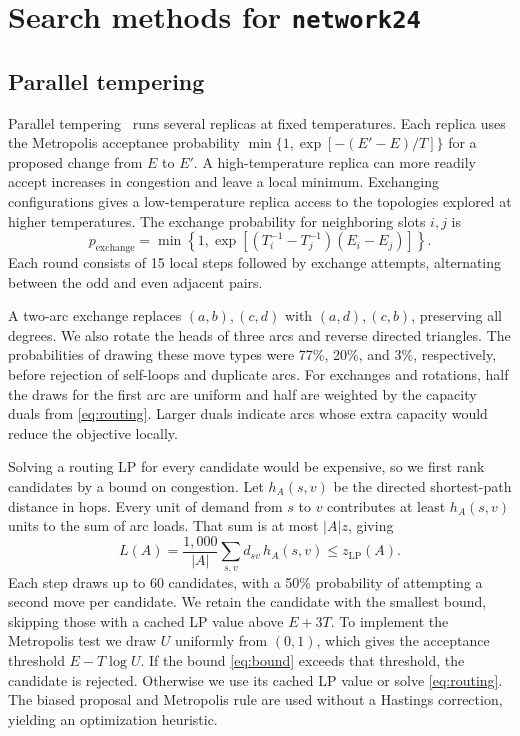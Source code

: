\documentclass[a4paper]{article}
\begin{document}
\section{Search methods for \texttt{network24}}

\subsection{Parallel tempering}

Parallel tempering~\cite{hukushima1996} runs several replicas at fixed temperatures.
Each replica uses the Metropolis acceptance probability \(\min\{1,\exp[-(E'-E)/T]\}\) for a proposed change from \(E\) to \(E'\).
A high-temperature replica can more readily accept increases in congestion and leave a local minimum.
Exchanging configurations gives a low-temperature replica access to the topologies explored at higher temperatures.
The exchange probability for neighboring slots \(i,j\) is
\[
 p_{\mathrm{exchange}}=\min\!\left\{1,\exp\!\left[
 (T_i^{-1}-T_j^{-1})(E_i-E_j)\right]\right\}.
\]
Each round consists of 15 local steps followed by exchange attempts, alternating between the odd and even adjacent pairs.

A two-arc exchange replaces \((a,b),(c,d)\) with \((a,d),(c,b)\), preserving all degrees. We also rotate the heads
of three arcs and reverse directed triangles. The probabilities of drawing these move types were
77\%, 20\%, and 3\%, respectively, before rejection of self-loops and duplicate arcs. For exchanges and rotations,
half the draws for the first arc are uniform and half are weighted by the capacity duals from \eqref{eq:routing}.
Larger duals indicate arcs whose extra capacity would reduce the objective locally.

Solving a routing LP for every candidate would be expensive, so we first rank candidates by a bound on congestion.
Let \(h_A(s,v)\) be the directed shortest-path distance in hops. Every unit of demand from \(s\) to \(v\) contributes
at least \(h_A(s,v)\) units to the sum of arc loads. That sum is at most \(\lvert A\rvert z\), giving
\begin{equation}
\label{eq:bound}
 L(A)=\frac{1{,}000}{\lvert A\rvert}\sum_{s,v}d_{sv}\,h_A(s,v)\le z_{\mathrm{LP}}(A).
\end{equation}
Each step draws up to 60 candidates, with a 50\% probability of attempting a second move per candidate.
We retain the candidate with the smallest bound, skipping those with a cached LP value above \(E+3T\).
To implement the Metropolis test we draw \(U\) uniformly from \((0,1)\), which gives the acceptance threshold \(E-T\log U\).
If the bound \eqref{eq:bound} exceeds that threshold, the candidate is rejected.
Otherwise we use its cached LP value or solve \eqref{eq:routing}.
The biased proposal and Metropolis rule are used without a Hastings correction, yielding an optimization heuristic.
\end{document}
